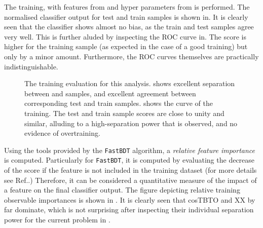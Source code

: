 The training, with features from  and hyper parameters from  is performed.
The normalised classifier output for test and train samples is shown in.
It is clearly seen that the classifier shows almost no bias, as the train and test samples agree very well.
This is further aluded by inspecting the ROC curve in.
The \AUC score is higher for the training sample (as expected in the case of a good training) but only by a minor amount.
Furthermore, the ROC curves themselves are practically indistinguishable.

\begin{figure}[htbp!]
    \caption{\label{fig:training_evaluation} The training evaluation for this analysis.
     shows excellent separation between \epem\ra\qqbar and \BtoXsgamma samples, and excellent agreement between corresponding test and train samples.
     shows the \ROC curve of the training. 
    The test and train sample \AUC scores are close to unity and similar, alluding to a high-separation power that is observed, and no evidence of overtraining.
    }
\end{figure}

Using the tools provided by the \texttt{FastBDT} algorithm, a \textit{relative feature importance} is computed.
Particularly for \texttt{FastBDT}, it is computed by evaluating the decrease of the \AUC score if the feature is not included in the training dataset (for more details see Ref.\cite{Keck:2017gsv}.)
Therefore, it can be considered a quantitative measure of the impact of a feature on the final classifier output.
The figure depicting relative training observable importances is shown in . 
It is clearly seen that cosTBTO and XX by far dominate, which is not surprising after inspecting their individual separation power for the current problem in .

